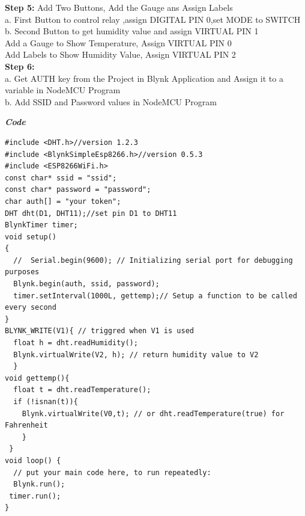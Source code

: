 \documentclass[12pt,a4paper]{article}
\begin{document}
\begin{flushleft}
\textbf{Step 5:} Add Two Buttons, Add the Gauge ans Assign Labels\\
\vspace{3mm}
\hspace{10mm}  a. First Button to control relay ,assign DIGITAL PIN 0,set MODE to SWITCH \\
\hspace{10mm} b. Second Button to get humidity value and assign VIRTUAL PIN 1\\ \vspace{3mm}
Add a Gauge to Show Temperature, Assign VIRTUAL PIN 0\\
Add Labels to Show Humidity Value, Assign VIRTUAL PIN 2\\
\vspace{4mm}
\textbf{Step 6:} \\
\hspace{10mm} a. Get AUTH key from the Project in Blynk Application and Assign it to a variable in NodeMCU Program \\
\hspace{10mm} b. Add SSID and Password values in NodeMCU Program
\vspace{4mm}

\textbf{\textit{Code}}
\begin{lstlisting}
#include <DHT.h>//version 1.2.3
#include <BlynkSimpleEsp8266.h>//version 0.5.3
#include <ESP8266WiFi.h>
const char* ssid = "ssid";
const char* password = "password";
char auth[] = "your token";
DHT dht(D1, DHT11);//set pin D1 to DHT11
BlynkTimer timer;
void setup()
{
  //  Serial.begin(9600); // Initializing serial port for debugging purposes  
  Blynk.begin(auth, ssid, password);
  timer.setInterval(1000L, gettemp);// Setup a function to be called every second
}
BLYNK_WRITE(V1){ // triggred when V1 is used
  float h = dht.readHumidity();
  Blynk.virtualWrite(V2, h); // return humidity value to V2
  }
void gettemp(){ 
  float t = dht.readTemperature();
  if (!isnan(t)){
    Blynk.virtualWrite(V0,t); // or dht.readTemperature(true) for Fahrenheit   
    }
 }
void loop() {
  // put your main code here, to run repeatedly:
  Blynk.run();
 timer.run();  
}
\end{lstlisting}


\end{flushleft}
\end{document}
